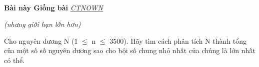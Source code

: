  

\textbf{Bài này Giống bài }\href{http://vnoi.info/problems/show/CTNOWN/}{\emph{ CTNOWN}}

\emph{(nhưng giới hạn lớn hơn) }

Cho nguyên dương N (1 $\le$ n $\le$ 3500). Hãy tìm cách phân tích N thành tổng của một số số nguyên dương sao cho bội số chung nhỏ nhất của chúng là lớn nhất có thể.

\